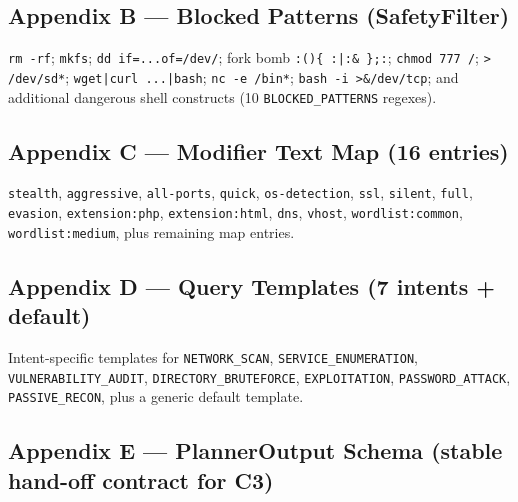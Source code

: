 \documentclass[10pt,journal,onecolumn]{IEEEtran}
\begin{document}
\subsection{Appendix B --- Blocked Patterns (SafetyFilter)}

\texttt{rm -rf}; \texttt{mkfs}; \texttt{dd if=...of=/dev/}; fork bomb \texttt{:()\{ :|:\& \};:}; \texttt{chmod 777 /}; \texttt{> /dev/sd*}; \texttt{wget|curl ...|bash}; \texttt{nc -e /bin*}; \texttt{bash -i >\&/dev/tcp}; and additional dangerous shell constructs (10 \texttt{BLOCKED\_PATTERNS} regexes).

\subsection{Appendix C --- Modifier Text Map (16 entries)}

\texttt{stealth}, \texttt{aggressive}, \texttt{all-ports}, \texttt{quick}, \texttt{os-detection}, \texttt{ssl}, \texttt{silent}, \texttt{full}, \texttt{evasion}, \texttt{extension:php}, \texttt{extension:html}, \texttt{dns}, \texttt{vhost}, \texttt{wordlist:common}, \texttt{wordlist:medium}, plus remaining map entries.

\subsection{Appendix D --- Query Templates (7 intents + default)}

Intent-specific templates for \texttt{NETWORK\_SCAN}, \texttt{SERVICE\_ENUMERATION}, \texttt{VULNERABILITY\_AUDIT}, \texttt{DIRECTORY\_BRUTEFORCE}, \texttt{EXPLOITATION}, \texttt{PASSWORD\_ATTACK}, \texttt{PASSIVE\_RECON}, plus a generic default template.

\subsection{Appendix E --- PlannerOutput Schema (stable hand-off contract for C3)}
\end{document}
